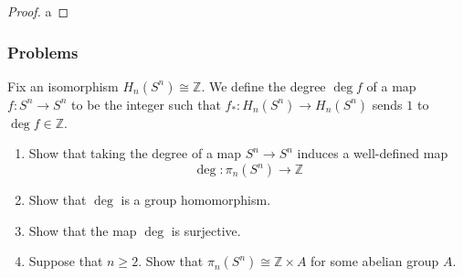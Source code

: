 \begin{proof}
    a
\end{proof}






\subsubsection{Problems}

    \begin{problem}[]
        Fix an isomorphism $H_n\left( S^{n} \right) \cong \mathbb{Z}$.
        We define the degree $\deg f$ of a map
        $f \colon S^{n} \to S^{n}$ to be the integer such that
        $f_* \colon H_n(S^{n}) \to H_n(S^{n})$ sends $1$ to
        $\deg f \in \mathbb{Z}$.
        \begin{enumerate}
            \item Show that taking the degree of a map
                $S^{n} \to S^{n}$ induces a well-defined
                map
                \[
                \deg \colon \pi_n(S^{n}) \to \mathbb{Z}
                \] 
            \item Show that $\deg $ is a group homomorphism.
            \item Show that the map $\deg$ is surjective.
            \item Suppose that $n\ge 2$. Show that
                $\pi_n\left( S^{n} \right) \cong
                \mathbb{Z} \times A$ for some abelian group $A$.
        \end{enumerate}
    \end{problem}

